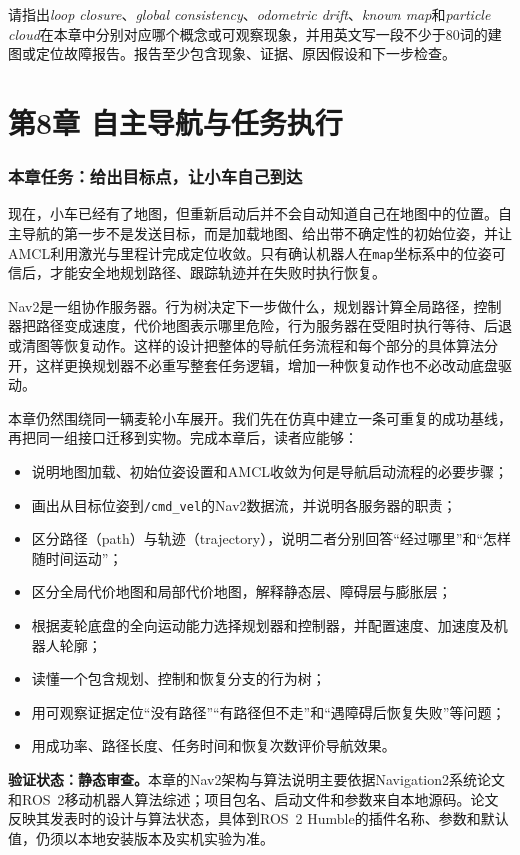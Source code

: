 \documentclass[UTF8,zihao=-4]{ctexart}
\newcommand{\bookchapter}[1]{%
  \clearpage\part*{#1}\addcontentsline{toc}{part}{#1}}
\DeclareRobustCommand{\code}[1]{\texttt{#1}}
\newcommand{\statusstatic}{\textbf{验证状态：静态审查。}}
\begin{document}
请指出\emph{loop closure}、\emph{global consistency}、\emph{odometric drift}、\emph{known map}和\emph{particle cloud}在本章中分别对应哪个概念或可观察现象，并用英文写一段不少于80词的建图或定位故障报告。报告至少包含现象、证据、原因假设和下一步检查。

\bookchapter{第8章 自主导航与任务执行}

\section*{本章任务：给出目标点，让小车自己到达}

现在，小车已经有了地图，但重新启动后并不会自动知道自己在地图中的位置。自主导航的第一步不是发送目标，而是加载地图、给出带不确定性的初始位姿，并让AMCL利用激光与里程计完成定位收敛。只有确认机器人在\code{map}坐标系中的位姿可信后，才能安全地规划路径、跟踪轨迹并在失败时执行恢复。

Nav2是一组协作服务器。行为树决定下一步做什么，规划器计算全局路径，控制器把路径变成速度，代价地图表示哪里危险，行为服务器在受阻时执行等待、后退或清图等恢复动作。这样的设计把整体的导航任务流程和每个部分的具体算法分开，这样更换规划器不必重写整套任务逻辑，增加一种恢复动作也不必改动底盘驱动\cite{macenski2020marathon}。

本章仍然围绕同一辆麦轮小车展开。我们先在仿真中建立一条可重复的成功基线，再把同一组接口迁移到实物。完成本章后，读者应能够：

\begin{itemize}
  \item 说明地图加载、初始位姿设置和AMCL收敛为何是导航启动流程的必要步骤；
  \item 画出从目标位姿到\code{/cmd\_vel}的Nav2数据流，并说明各服务器的职责；
  \item 区分路径（path）与轨迹（trajectory），说明二者分别回答“经过哪里”和“怎样随时间运动”；
  \item 区分全局代价地图和局部代价地图，解释静态层、障碍层与膨胀层；
  \item 根据麦轮底盘的全向运动能力选择规划器和控制器，并配置速度、加速度及机器人轮廓；
  \item 读懂一个包含规划、控制和恢复分支的行为树；
  \item 用可观察证据定位“没有路径”“有路径但不走”和“遇障碍后恢复失败”等问题；
  \item 用成功率、路径长度、任务时间和恢复次数评价导航效果。
\end{itemize}

\noindent\statusstatic 本章的Nav2架构与算法说明主要依据Navigation2系统论文和ROS~2移动机器人算法综述\cite{macenski2020marathon,macenski2023survey}；项目包名、启动文件和参数来自本地源码。论文反映其发表时的设计与算法状态，具体到ROS~2 Humble的插件名称、参数和默认值，仍须以本地安装版本及实机实验为准。
\end{document}
